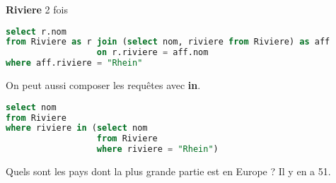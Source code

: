 {\bf Riviere} 2 fois
\begin{Answer}
\begin{lstlisting}[language=SQL]
select r.nom
from Riviere as r join (select nom, riviere from Riviere) as aff 
                  on r.riviere = aff.nom
where aff.riviere = "Rhein"
\end{lstlisting}

On peut aussi composer les requêtes avec {\bf in}.

\begin{lstlisting}[language=SQL]
select nom
from Riviere 
where riviere in (select nom
                  from Riviere
                  where riviere = "Rhein")
\end{lstlisting}
\end{Answer}
\begin{Exercise}
Quels sont les pays dont la plus grande partie est en Europe ? Il y en a 51.
\end{Exercise}

